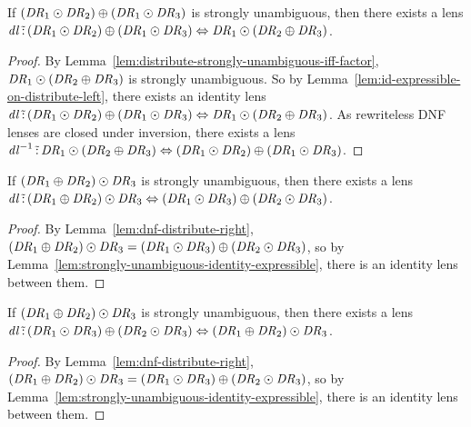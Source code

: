 \documentclass[numbers,10pt,preprint\ifanon ,nocopyrightspace\fi]{sigplanconf}
\begin{document}
\begin{lemma}
  \label{lem:id-expressible-on-factor-left}
  If $(\mathit{DR}_1 \odot \mathit{DR}_2) \oplus
  (\mathit{DR}_1 \odot \mathit{DR}_3)$ is strongly
  unambiguous, then there exists a lens
  $\mathit{dl} \,\tilde{:}\,
  (\mathit{DR}_1 \odot \mathit{DR}_2) \oplus
  (\mathit{DR}_1 \odot \mathit{DR}_3)
  \Leftrightarrow
  \mathit{DR}_1 \odot (\mathit{DR}_2 \oplus \mathit{DR}_3)$.
\end{lemma}
\begin{proof}
  By Lemma~\ref{lem:distribute-strongly-unambiguous-iff-factor},
  $\mathit{DR}_1 \odot (\mathit{DR}_2 \oplus \mathit{DR}_3)$ is strongly
  unambiguous.
  So by Lemma~\ref{lem:id-expressible-on-distribute-left},
  there exists an identity lens
  $\mathit{dl} \,\tilde{:}\,
  (\mathit{DR}_1 \odot \mathit{DR}_2) \oplus
  (\mathit{DR}_1 \odot \mathit{DR}_3)
  \Leftrightarrow
  \mathit{DR}_1 \odot (\mathit{DR}_2 \oplus \mathit{DR}_3)$.
  As rewriteless DNF lenses are closed under inversion, there exists a lens
  $\mathit{dl}^{-1} \,\tilde{:}\,
  \mathit{DR}_1 \odot (\mathit{DR}_2 \oplus \mathit{DR}_3)
  \Leftrightarrow
  (\mathit{DR}_1 \odot \mathit{DR}_2) \oplus
  (\mathit{DR}_1 \odot \mathit{DR}_3)$.
\end{proof}

\begin{lemma}
  \label{lem:id-expressible-on-distribute-right}
  If $(\mathit{DR}_1 \oplus \mathit{DR}_2) \odot \mathit{DR}_3$ is strongly
  unambiguous, then there exists a lens
  $\mathit{dl} \,\tilde{:}\,
  (\mathit{DR}_1 \oplus \mathit{DR}_2) \odot \mathit{DR}_3
  \Leftrightarrow
  (\mathit{DR}_1 \odot \mathit{DR}_3) \oplus
  (\mathit{DR}_2 \odot \mathit{DR}_3)$.
\end{lemma}
\begin{proof}
  By Lemma~\ref{lem:dnf-distribute-right}, $(\mathit{DR}_1 \oplus \mathit{DR}_2)
  \odot \mathit{DR}_3 = (\mathit{DR}_1 \odot \mathit{DR}_3) \oplus
  (\mathit{DR}_2 \odot \mathit{DR}_3)$, so by
  Lemma~\ref{lem:strongly-unambiguous-identity-expressible}, there is an
  identity lens between them.
\end{proof}

\begin{lemma}
  \label{lem:id-expressible-on-factor-right}
  If $(\mathit{DR}_1 \oplus \mathit{DR}_2) \odot \mathit{DR}_3$ is strongly
  unambiguous, then there exists a lens
  $\mathit{dl} \,\tilde{:}\,
  (\mathit{DR}_1 \odot \mathit{DR}_3) \oplus
  (\mathit{DR}_2 \odot \mathit{DR}_3)
  \Leftrightarrow
  (\mathit{DR}_1 \oplus \mathit{DR}_2) \odot \mathit{DR}_3$.
\end{lemma}
\begin{proof}
  By Lemma~\ref{lem:dnf-distribute-right}, $(\mathit{DR}_1 \oplus \mathit{DR}_2)
  \odot \mathit{DR}_3 = (\mathit{DR}_1 \odot \mathit{DR}_3) \oplus
  (\mathit{DR}_2 \odot \mathit{DR}_3)$, so by
  Lemma~\ref{lem:strongly-unambiguous-identity-expressible}, there is an
  identity lens between them.
\end{proof}
\end{document}
